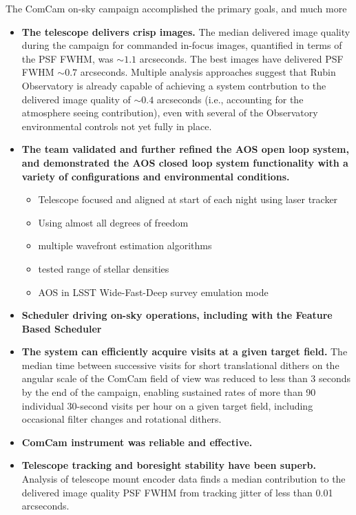 The ComCam on-sky campaign accomplished the primary goals, and much more

\begin{itemize}
    \item \textbf{The telescope delivers crisp images.}
    The median delivered image quality during the campaign for commanded in-focus images, quantified in terms of the PSF FWHM, was $\sim1.1$ arcseconds.
    The best images have delivered PSF FWHM $\sim0.7$ arcseconds.
    Multiple analysis approaches suggest that Rubin Observatory is already capable of achieving a system contrbution to the delivered image quality of $\sim0.4$ arcseconds (i.e., accounting for the atmosphere seeing contribution), even with several of the Observatory environmental controls not yet fully in place.
    \item \textbf{The team validated and further refined the AOS open loop system, and demonstrated the AOS closed loop system functionality with a variety of configurations and environmental conditions.}
    \begin{itemize}
        \item Telescope focused and aligned at start of each night using laser tracker
        \item Using almost all degrees of freedom
        \item multiple wavefront estimation algorithms
        \item tested range of stellar densities
        \item AOS in LSST Wide-Fast-Deep survey emulation mode
    \end{itemize}
    \item \textbf{Scheduler driving on-sky operations, including with the Feature Based Scheduler}
    \item \textbf{The system can efficiently acquire visits at a given target field.} The median time between successive visits for short translational dithers on the angular scale of the ComCam field of view was reduced to less than 3 seconds by the end of the campaign, enabling sustained rates of more than 90 individual 30-second visits per hour on a given target field, including occasional filter changes and rotational dithers.
    \item \textbf{ComCam instrument was reliable and effective.}
    \item \textbf{Telescope tracking and boresight stability have been superb.} Analysis of telescope mount encoder data finds a median contribution to the delivered image quality PSF FWHM from tracking jitter of less than 0.01 arcseconds.

\end{itemize}
